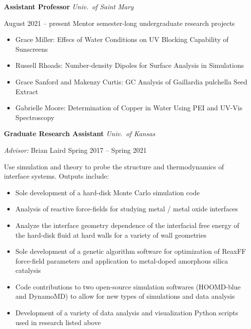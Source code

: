 \begin{minipage}{\textwidth}
  {\bf Assistant Professor} \hfill \textit{Univ.\ of Saint Mary}

  \hfill August 2021 -- present
  \linebreak Mentor semester-long undergraduate research projects
  \begin{itemize}[rightmargin=2cm]
    \item Grace Miller: Effecs of Water Conditions on UV Blocking Capability of Sunscreens
    \item Russell Rhoads: Number-density Dipoles for Surface Analysis in Simulations
    \item Grace Sanford and Makenzy Curtis: GC Analysis of Gaillardia pulchella Seed Extract 
    \item Gabrielle Moore: Determination of Copper in Water Using PEI and UV-Vis Spectroscopy
  \end{itemize}
\end{minipage}

\vspace{\y}

\begin{minipage}{\textwidth}
  {\bf Graduate Research Assistant} \hfill \textit{Univ.\ of Kansas}

  \textit{Advisor: } Brian Laird \hfill Spring 2017 -- Spring 2021

  Use simulation and theory to probe the structure and thermodynamics of interface systems. Outputs include:
  \begin{itemize}[rightmargin=2cm]
    \item Sole development of a hard-disk Monte Carlo simulation code
    \item Analysis of reactive force-fields for studying metal / metal oxide interfaces
    \item Analyze the interface geometry dependence of the interfacial free energy of the hard-disk fluid at hard walls for a variety of wall geometries
    \item Sole development of a genetic algorithm software for optimization of ReaxFF force-field parameters and application to metal-doped amorphous silica catalysis
    \item Code contributions to two open-source simulation softwares (HOOMD-blue and DynamoMD) to allow for new types of simulations and data analysis
    \item Development of a variety of data analysis and visualization Python scripts used in research listed above
  \end{itemize}
\end{minipage}

